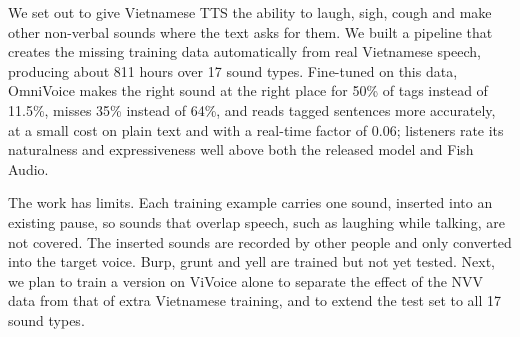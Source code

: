 \documentclass[a4paper]{article}
\makeatletter
\renewcommand{\normalsize}{\fontsize{13.5pt}{15.5pt}\selectfont}
\renewcommand{\section}{\@startsection{section}{1}{0pt}{7pt}{7pt}{\normalfont\normalsize\bfseries\centering}}
\makeatother
\begin{document}
\section{Conclusion}\label{sec:conclusion}
We set out to give Vietnamese TTS the ability to laugh, sigh, cough and make other non-verbal
sounds where the text asks for them. We built a pipeline that creates the missing training data
automatically from real Vietnamese speech, producing about 811 hours over 17 sound types.
Fine-tuned on this data, OmniVoice makes the right sound at the right place for 50\% of tags instead of 11.5\%,
misses 35\% instead of 64\%, and reads tagged sentences more accurately, at a small cost on plain
text and with a real-time factor of 0.06; listeners rate its naturalness and expressiveness well
above both the released model and Fish Audio.

The work has limits. Each training example carries one sound, inserted into an existing pause,
so sounds that overlap speech, such as laughing while talking, are not covered. The inserted
sounds are recorded by other people and only converted into the target voice. Burp, grunt and
yell are trained but not yet tested. Next, we plan to train a version on ViVoice alone to separate the effect of the NVV data from that of extra Vietnamese
training, and to extend the test set to all 17 sound types.



\end{document}
